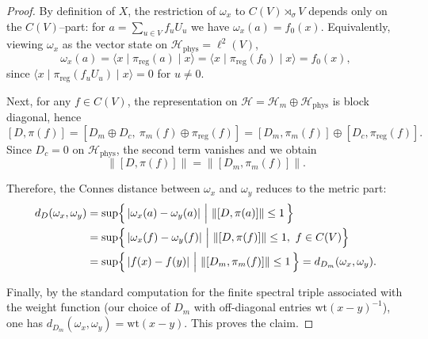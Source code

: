 \documentclass[12pt]{article}
\theoremstyle{definition} %
\theoremstyle{plain} %
\theoremstyle{remark} %
\theoremstyle{underline}
\begin{document}
\disred*

\begin{proof}
By definition of $X$, the restriction of $\omega_x$ to $C(V)\rtimes_\sigma V$ depends only on the
$C(V)$--part: for $a=\sum_{u\in V} f_uU_u$ we have $\omega_x(a)=f_0(x)$.
Equivalently, viewing $\omega_x$ as the vector state on $\mathcal H_{\mathrm{phys}}=\ell^2(V)$,
\[
\omega_x(a)=\langle x\mid \pi_{\mathrm{reg}}(a)\mid x\rangle
           =\langle x\mid \pi_{\mathrm{reg}}(f_0)\mid x\rangle
           = f_0(x),
\]
since $\langle x\mid \pi_{\mathrm{reg}}(f_uU_u)\mid x\rangle=0$ for $u\neq 0$.

Next, for any $f\in C(V)$, the representation on $\mathcal H=\mathcal H_m\oplus\mathcal H_{\mathrm{phys}}$
is block diagonal, hence
\[
[D,\pi(f)]
=
[D_m\oplus D_c,\ \pi_m(f)\oplus \pi_{\mathrm{reg}}(f)]
=
[D_m,\pi_m(f)]\oplus [D_c,\pi_{\mathrm{reg}}(f)].
\]
Since $D_c=0$ on $\mathcal H_{\mathrm{phys}}$, the second term vanishes and we obtain
\[
\|[D,\pi(f)]\|=\|[D_m,\pi_m(f)]\|.
\]

Therefore, the Connes distance between $\omega_x$ and $\omega_y$ reduces to the metric part:
\begin{align*}
d_D(\omega_x,\omega_y)
&=\sup\Bigl\{\,|\omega_x(a)-\omega_y(a)|\ \Big|\ \|[D,\pi(a)]\|\le 1\,\Bigr\} \\
&=\sup\Bigl\{\,|\omega_x(f)-\omega_y(f)|\ \Big|\ \|[D,\pi(f)]\|\le 1,\ f\in C(V)\Bigr\} \\
&=\sup\Bigl\{\,|f(x)-f(y)|\ \Big|\ \|[D_m,\pi_m(f)]\|\le 1\,\Bigr\}
= d_{D_m}(\omega_x,\omega_y).
\end{align*}

Finally, by the standard computation for the finite spectral triple associated with the weight function
(our choice of $D_m$ with off-diagonal entries $\mathrm{wt}(x-y)^{-1}$),
one has $d_{D_m}(\omega_x,\omega_y)=\mathrm{wt}(x-y)$.
This proves the claim.
\end{proof}



\ay*
\end{document}

